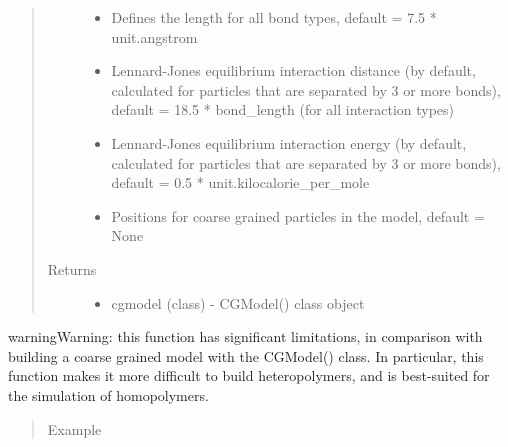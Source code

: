 \documentclass[letterpaper,12pt,english,openany,oneside]{sphinxmanual}
\begin{document}
\begin{fulllineitems}
\begin{quote}
\begin{description}
\begin{itemize}
\item {} 
 \textendash{} Defines the length for all bond types, default = 7.5 * unit.angstrom

\item {} 
 \textendash{} Lennard-Jones equilibrium interaction distance (by default, calculated for particles that are separated by 3 or more bonds), default = 18.5 * bond\_length (for all interaction types)

\item {} 
 \textendash{} Lennard-Jones equilibrium interaction energy (by default, calculated for particles that are separated by 3 or more bonds), default = 0.5 * unit.kilocalorie\_per\_mole

\item {} 
 \textendash{} Positions for coarse grained particles in the model, default = None

\end{itemize}

\item[{Returns}] \leavevmode
\begin{itemize}
\item {} 
cgmodel (class) - CGModel() class object

\end{itemize}


\end{description}\end{quote}

\begin{sphinxadmonition}{warning}{Warning:}
this function has significant limitations, in comparison with building a coarse grained model with the CGModel() class.  In particular, this function makes it more difficult to build heteropolymers, and is best-suited for the simulation of homopolymers.
\end{sphinxadmonition}
\begin{quote}\begin{description}
\item[{Example}] \leavevmode
\end{description}\end{quote}


\end{fulllineitems}
\end{document}
